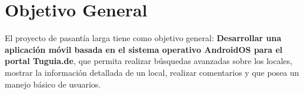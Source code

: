 \section{Objetivo General} \label{sect:objetivo_general}

El proyecto de pasantía larga tiene como objetivo general: \textbf{Desarrollar una aplicación móvil basada en el sistema operativo AndroidOS para el portal Tuguia.de}, que permita realizar búsquedas avanzadas sobre los locales, mostrar la información detallada de un local, realizar comentarios y que posea un manejo básico de usuarios.

 